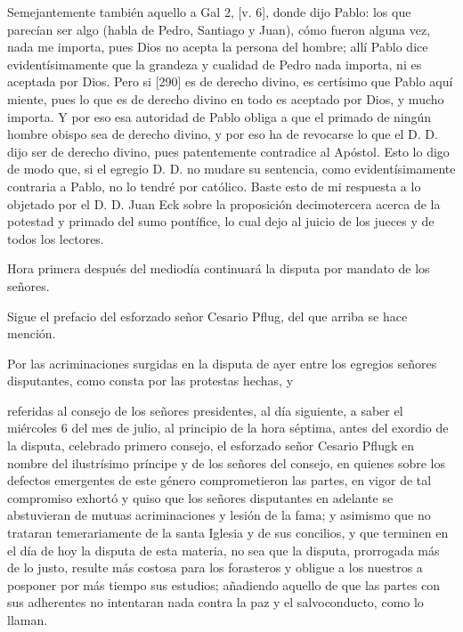 Semejantemente también aquello a Gal 2, [v. 6], donde dijo Pablo: los que parecían ser algo (habla de Pedro, Santiago y Juan), cómo fueron alguna vez, nada me importa, pues Dios no acepta la persona del hombre; allí Pablo dice evidentísimamente que la grandeza y cualidad de Pedro nada importa, ni es aceptada por Dios. Pero si [290] es de derecho divino, es certísimo que Pablo aquí miente, pues lo que es de derecho divino en todo es aceptado por Dios, y mucho importa. Y por eso esa autoridad de Pablo obliga a que el primado de ningún hombre obispo sea de derecho divino, y por eso ha de revocarse lo que el D. D. dijo ser de derecho divino, pues patentemente contradice al Apóstol. Esto lo digo de modo que, si el egregio D. D. no mudare su sentencia, como evidentísimamente contraria a Pablo, no lo tendré por católico. Baste esto de mi respuesta a lo objetado por el D. D. Juan Eck sobre la proposición decimotercera acerca de la potestad y primado del sumo pontífice, lo cual dejo al juicio de los jueces y de todos los lectores.

Hora primera después del mediodía continuará la disputa por mandato de los señores.

Sigue el prefacio del esforzado señor Cesario Pflug, del que arriba se hace mención.

Por las acriminaciones surgidas en la disputa de ayer entre los egregios señores disputantes, como consta por las protestas hechas, y

referidas al consejo de los señores presidentes, al día siguiente, a saber el miércoles 6 del mes de julio, al principio de la hora séptima, antes del exordio de la disputa, celebrado primero consejo, el esforzado señor Cesario Pflugk en nombre del ilustrísimo príncipe y de los señores del consejo, en quienes sobre los defectos emergentes de este género comprometieron las partes, en vigor de tal compromiso exhortó y quiso que los señores disputantes en adelante se abstuvieran de mutuas acriminaciones y lesión de la fama; y asimismo que no trataran temerariamente de la santa Iglesia y de sus concilios, y que terminen en el día de hoy la disputa de esta materia, no sea que la disputa, prorrogada más de lo justo, resulte más costosa para los forasteros y obligue a los nuestros a posponer por más tiempo sus estudios; añadiendo aquello de que las partes con sus adherentes no intentaran nada contra la paz y el salvoconducto, como lo llaman.

